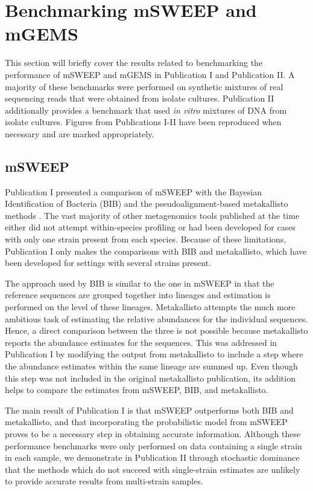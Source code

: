\documentclass[officiallayout]{tktla}
\begin{document}
\section{Benchmarking mSWEEP and mGEMS}

This section will briefly cover the results related to benchmarking
the performance of mSWEEP and mGEMS in Publication I and Publication
II. A majority of these benchmarks were performed on synthetic
mixtures of real sequencing reads that were obtained from isolate
cultures. Publication II additionally provides a benchmark that used
\textit{in vitro} mixtures of DNA from isolate cultures. Figures from
Publications I-II have been reproduced when necessary and are marked
appropriately.

\subsection{mSWEEP}
Publication I presented a comparison of mSWEEP with
the Bayesian Identification of Bacteria (BIB) \citep{sankar2016bayesian} and the
pseudoalignment-based metakallisto methods \citep{schaeffer2017pseudoalignment}. The vast
majority of other metagenomics tools published at the time either did
not attempt within-species profiling or had been developed for cases
with only one strain present from each species. Because of these
limitations, Publication I only makes the comparisons with BIB and
metakallisto, which have been developed for settings with several
strains present.

The approach used by BIB is similar to the one in mSWEEP in that the
reference sequences are grouped together into lineages and estimation
is performed on the level of these lineages. Metakallisto attempts the
much more ambitious task of estimating the relative abundances for the
individual sequences. Hence, a direct comparison between the three is
not possible because metakallisto reports the abundance estimates for
the sequences. This was addressed in Publication I by modifying the
output from metakallisto to include a step where the abundance
estimates within the same lineage are summed up. Even though this step was
not included in the original metakallisto publication, its addition helps to
compare the estimates from mSWEEP, BIB, and metakallisto.

The main result of Publication I is that mSWEEP outperforms both BIB
and metakallisto, and that incorporating the probabilistic model from
mSWEEP proves to be a necessary step in obtaining accurate
information. Although these performance benchmarks were only performed
on data containing a single strain in each sample, we demonstrate in
Publication II through stochastic dominance \citep{hadar1969rules,
  bawa1975optimal} that the methods which do not succeed with
single-strain estimates are unlikely to provide accurate results from
multi-strain samples.
\end{document}

